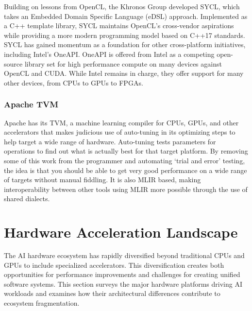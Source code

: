 \documentclass[manuscript,screen,review,format=acmsmall]{acmart}
\begin{document}
Building on lessons from OpenCL, the Khronos Group developed SYCL, which takes an Embedded Domain Specific Language (eDSL) approach. Implemented as a C++ template library, SYCL maintains OpenCL's cross-vendor aspirations while providing a more modern programming model based on C++17 standards. SYCL has gained momentum as a foundation for other cross-platform initiatives, including Intel's OneAPI. OneAPI is offered from Intel as a competing open-source library set for high performance compute on many devices against OpenCL and CUDA. While Intel remains in charge, they offer support for many other devices, from CPUs to GPUs to FPGAs. \cite{OneAPICloud}














\subsubsection{Apache TVM}
 
Apache has its TVM, a machine learning compiler for CPUs, GPUs, and other accelerators that makes judicious use of auto-tuning in its optimizing steps to help target a wide range of hardware\cite{ChenTianqi2018TAAE}. Auto-tuning tests parameters for operations to find out what is actually best for that target platform. By removing some of this work from the programmer and automating ‘trial and error’ testing, the idea is that you should be able to get very good performance on a wide range of targets without manual fiddling.
It is also MLIR based, making interoperability between other tools using MLIR more possible through the use of shared dialects.
















\section{Hardware Acceleration Landscape}

The AI hardware ecosystem has rapidly diversified beyond traditional CPUs and GPUs to include specialized accelerators. This diversification creates both opportunities for performance improvements and challenges for creating unified software systems. This section surveys the major hardware platforms driving AI workloads and examines how their architectural differences contribute to ecosystem fragmentation.
\end{document}
